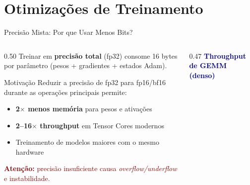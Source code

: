 \documentclass[aspectratio=169, xcolor=dvipsnames]{beamer}
\begin{document}
  \section{Otimizações de Treinamento}

  \begin{frame}{Precisão Mista: Por que Usar Menos Bits? \cite{micikevicius2018mixed}}
    \begin{columns}[T]
      \begin{column}{0.50\textwidth}
        Treinar em \textbf{precisão total} (fp32) consome 16 bytes
        por parâmetro (pesos + gradientes + estados Adam).

        \begin{block}{Motivação}
          Reduzir a precisão de fp32 para fp16/bf16 durante as
          operações principais permite:
          \begin{itemize}
            \item \textbf{2$\times$ menos memória} para pesos e ativações
            \item \textbf{2--16$\times$ throughput} em Tensor Cores modernos
            \item Treinamento de modelos maiores com o mesmo hardware
          \end{itemize}
        \end{block}

        \textcolor{DarkRed}{\footnotesize \textbf{Atenção:} precisão insuficiente causa \textit{overflow/underflow} e instabilidade.}
      \end{column}
      \begin{column}{0.47\textwidth}
        \textcolor{DarkBlue}{\textbf{Throughput de GEMM (denso)}}
        \vspace{0.3em}



\end{column}
\end{columns}
\end{frame}
\end{document}
